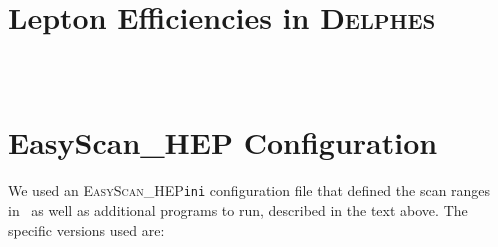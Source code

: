\documentclass{article}
\newcommand{\mapyde}{\texttt{mapyde}}
\newcommand{\delphes}{\textsc{Delphes}}
\newcommand{\easyscanhep}{\textsc{EasyScan\_HEP}}
\begin{document}
\printbibliography

\appendix

\newpage

\section{Lepton Efficiencies in \delphes} \label{sec:lepton-efficiencies-in-delphes}

\begin{listing}
	\inputminted[firstline=1,lastline=2]{cpp}{ANA-SUSY-2019-08.cxx}
	\caption{A snippet of \texttt{SimpleAnalysisCodes/src/ANA-SUSY-2019-08.cxx}~\cite{SAGitLab} showing how the analysis name is defined.}
	\label{lst:analysiscodenaming}
\end{listing}


\begin{listing}[H]
	\inputminted[frame=single,framesep=2mm,firstline=476,lastline=503]{ini}{{auxdata/delphes_card_ATLAS_lowptleptons_sleptons_notrackineffic.tcl}}
	\caption{A snippet from the \mapyde-provided \delphes{} configuration for electron efficiencies. The portion that is commented out is what comes from the default ATLAS configuration. These numbers come from Ref.~\cite{ATLAS:2019lng}.}
	\label{lst:delphes-electron-efficiencies}
\end{listing}

\begin{listing}[H]
	\inputminted[frame=single,framesep=2mm,firstline=526,lastline=554]{ini}{{auxdata/delphes_card_ATLAS_lowptleptons_sleptons_notrackineffic.tcl}}
	\caption{A snippet from the \mapyde-provided \delphes{} configuration for muon efficiencies. The portion that is commented out is what comes from the default ATLAS configuration. These numbers come from Ref.~\cite{ATLAS:2019lng}.}
	\label{lst:delphes-muon-efficiencies}
\end{listing}


\section{EasyScan\_HEP Configuration}
\label{sec:easyscan-hep-configuration}

We used an \easyscanhep \texttt{ini} configuration file that defined the scan ranges in~ as well as additional programs to run, described in the text above. The specific versions used are:
\end{document}
